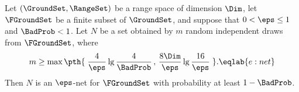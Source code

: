 \begin {theorem} Let $(\GroundSet ,\RangeSet )$ be a range s{}p\-ace of \VC dimension $\Dim $, let $\FGroundSet $ be a finite subset of $\GroundSet $, and suppose that $0 < \eps \leq 1$ and $\BadProb < 1$. Let $N$ be a set obtained by $m$ random independent draws from $\FGroundSet $, where \begin {equation} m \geq \max \pth {\; \frac {4}{\eps } \lg \frac {4}{\BadProb } \,,\, \frac {8\Dim }{\eps }\lg \frac {16}{\eps } \;}. \eqlab {e:net} \end {equation} Then $N$ is an $\eps $-net for $\FGroundSet $ with probability at least $1-\BadProb $. \end {theorem}
